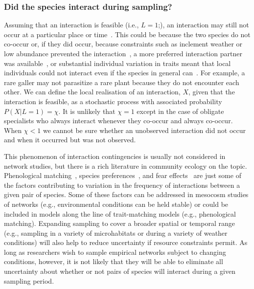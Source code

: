 \documentclass[12pt]{article}
\begin{document}
\begin{spacing}{2.0}
        \subsubsection*{Did the species interact during sampling?} 

          Assuming that an interaction is feasible (i.e., $L=1$;), an interaction may still not occur at a particular place or time~\citep{Poisot2015,Graham2018}. This could be because the two species do not co-occur or, if they did occur, because constraints such as inclement weather or low abundance prevented the interaction~\citep{Jordano2016,Graham2018}, a more preferred interaction partner was available~\citep{Weinstein2017a}, or substantial individual variation in traits meant that local individuals could not interact even if the species in general can~\citep{Gravel2013,Poisot2015}. For example, a rare galler may not parasitize a rare plant because they do not encounter each other. 
          We can define the local realisation of an interaction, $X$, given that the interaction is feasible, as a stochastic process with associated probability $P(X|L=1)=\chi$. It is unlikely that $\chi=1$  except in the case of obligate specialists who always interact whenever they co-occur and always co-occur. When $\chi<1$ we cannot be sure whether an unobserved interaction did not occur and when it occurred but was not observed.

          This phenomenon of interaction contingencies is usually not considered in network studies, but there is a rich literature in community ecology  on the topic. Phenological matching~\citep{MillerRushing2010,Gezon2016}, species preferences~\citep{Pires2011,Novak2015,Coux2016}, and fear effects~\citep{Luttbeg2005,Wirsing2008} are just some of the factors contributing to variation in the frequency of interactions between a given pair of species. Some of these factors can be addressed in mesocosm studies of networks (e.g., environmental conditions can be held stable) or could be included in models along the line of trait-matching models (e.g., phenological matching). Expanding sampling to cover a broader spatial or temporal range (e.g., sampling in a variety of microhabitats or during a variety of weather conditions) will also help to reduce uncertainty if resource constraints permit. As long as researchers wish to sample empirical networks subject to changing conditions, however, it is not likely that they will be able to eliminate all uncertainty about whether or not pairs of species will interact during a given sampling period.



\end{spacing}
\end{document}

